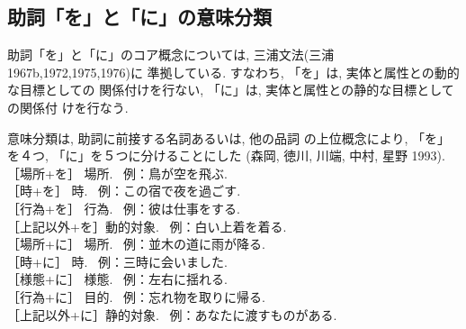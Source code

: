 \subsection{助詞「を」と「に」の意味分類}
\label{sec:wotoni}
助詞「を」と「に」のコア概念については, 
三浦文法(三浦 1967b,1972,1975,1976)に
準拠している. すなわち, 「を」は, 実体と属性との動的な目標としての
関係付けを行ない, 「に」は, 実体と属性との静的な目標としての関係付
けを行なう. 

意味分類は, 助詞に前接する名詞あるいは, 他の品詞
の上位概念により, 「を」を４つ, 「に」を５つに分けることにした
(森岡, 徳川, 川端, 中村, 星野 1993).\\
［場所+を］  場所. ~例：鳥が空を飛ぶ. \\
［時+を］    時.   ~例：この宿で夜を過ごす. \\
［行為+を］  行為. ~例：彼は仕事をする. \\
［上記以外+を］動的対象. ~例：白い上着を着る. \\
［場所+に］  場所. ~例：並木の道に雨が降る. \\
［時+に］    時.   ~例：三時に会いました. \\
［様態+に］  様態. ~例：左右に揺れる. \\
［行為+に］  目的. ~例：忘れ物を取りに帰る. \\
［上記以外+に］静的対象. ~例：あなたに渡すものがある. 

